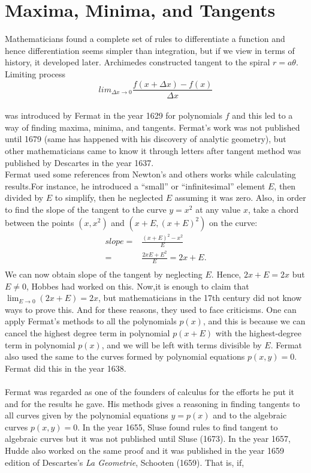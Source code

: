 \documentclass[a4paper,reqno,11pt]{book}
\theoremstyle{plain}%
\theoremstyle{definition}
\begin{document}
\section{Maxima, Minima, and Tangents}
Mathematicians found a complete set of rules to differentiate a function and hence differentiation seems simpler than integration, but if we view in terms of history, it developed later. Archimedes constructed tangent to the spiral $r = a\theta$. Limiting process\\
$$lim_{\Delta x\to0} \frac{f(x + \Delta x) - f(x)}{\Delta x}$$
\\
was introduced by Fermat in the year 1629 for polynomials $f$ and this led to a way of finding maxima, minima, and tangents. Fermat’s work was not published until 1679 (same has happened with his discovery of analytic geometry), but other mathematicians came to know it through letters after tangent method was published by Descartes in the year 1637.\\
\indent Fermat used some references from Newton's and others works while calculating results.For instance, he introduced a “small” or “infinitesimal” element $E$, then divided by $E$ to simplify, then he neglected $E$ assuming it was zero. Also, in order to find the slope of the tangent to the curve $y = x^2$ at any value $x$, take a chord between the points $(x, x^2)$ and $(x + E,(x + E)^2)$ on the curve:\\
\begin{align*}
slope =& \frac{(x+E)^2 - x^2}{E}\\
=& \frac{2xE + E^2}{E} = 2x + E.\\
\end{align*}
We can now obtain slope of the tangent by neglecting $E$.  Hence, $2x + E = 2x$ but $E \neq 0$, Hobbes had worked on this. Now,it is enough to claim that
$\lim_{E\to0} (2x + E) = 2x$, but mathematicians in the 17th century did not know ways to prove this. And for these reasons, they used to face criticisms. One can apply Fermat’s methods to all the polynomials $p(x)$, and this is because we can cancel the highest degree term in polynomial $p(x + E)$ with the highest-degree term in polynomial $p(x)$, and we will be left with terms divisible by $E$. Fermat also used the same to the curves formed by polynomial equations $p(x, y) = 0$. Fermat did this in the year 1638.\\
\\
\indent Fermat was regarded as one of the founders of calculus for the efforts he put it and for the results he gave. His methods gives a reasoning in finding tangents to all curves given by the polynomial equations $y = p(x)$ and to the algebraic curves $p(x, y) = 0$. In the year 1655, Sluse found rules to find tangent to algebraic curves but it was not published until Sluse (1673). In the year 1657, Hudde also worked on the same proof and it was published in the year 1659 edition of Descartes’s \textit{La Geometrie}, Schooten (1659). That is, if,\\
\end{document}
